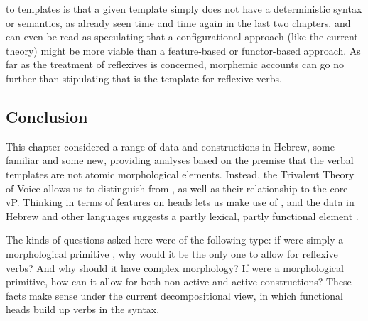 \begin{exe}
\begin{xlist}
\begin{xlist}
\begin{exe}
\begin{xlist}
\begin{xlist}
\begin{exe}
\begin{xlist}
\begin{xlist}
\begin{exe}
\begin{exe}
\begin{xlist}
\begin{exe}
\begin{exe}
\begin{xlist}
\begin{exe}
\begin{exe}
\begin{exe}
\begin{exe}
\begin{exe}
\begin{xlist}
\begin{exe}
\begin{xlist}
\begin{exe}
\begin{exe}
\begin{xlist}
\begin{exe}
\begin{xlist}
\begin{exe}
\begin{xlist}
\begin{exe}
\begin{exe}
\begin{exe}
\begin{xlist}
\begin{exe}
\begin{exe}
\begin{exe}
\begin{xlist}
\begin{exe}
\begin{xlist}
\begin{exe}
\begin{exe}
\begin{xlist}
\begin{exe}
\begin{exe}
\begin{exe}
\begin{exe}
\begin{xlist}
\begin{exe}
\begin{xlist}
\begin{exe}
\begin{xlist}
\begin{exe}
\begin{xlist}
\begin{exe}
\begin{xlist}
\begin{exe}
\begin{xlist}
\begin{exe}
\begin{exe}
\begin{xlist}
\begin{exe}
\begin{xlist}
\begin{exe}
\begin{exe}
\begin{xlist}
\begin{exe}
\begin{xlist}
\begin{exe}
\begin{exe}
\begin{exe}
\begin{exe}
\begin{xlist}
\begin{xlist}
\begin{exe}
\begin{xlist}
\begin{exe}
\begin{exe}
\begin{exe}
\begin{xlist}
\begin{exe}
\begin{exe}
\begin{xlist}
\begin{exe}
\begin{exe}
\begin{exe}
\begin{xlist}
\begin{xlist}
\begin{exe}
\begin{xlist}
\begin{exe}
\begin{exe}
\begin{exe}
\begin{exe}
\begin{xlist}
\begin{exe}
\begin{xlist}
\begin{exe}
\begin{xlist}
\begin{exe}
\begin{xlist}
\begin{exe}
\begin{exe}
\begin{exe}
\begin{exe}
\begin{exe}
\begin{xlist}
\begin{exe}
\begin{xlist}
\begin{exe}
\begin{xlist}
\begin{xlist}
\begin{exe}
\begin{xlist}
\begin{exe}
\begin{xlist}
\begin{exe}
\begin{xlist}
\begin{exe}
\begin{xlist}
to templates is that a given template simply does not have a deterministic syntax or semantics, as already seen time and time again in the last two chapters. \citet[197]{arad05} and \citet[564]{borer13oup} can even be read as speculating that a configurational approach (like the current theory) might be more viable than a feature-based or functor-based approach. As far as the treatment of reflexives is concerned, morphemic accounts can go no further than stipulating that {\thit} is the template for reflexive verbs.

	\subsection{Conclusion} \label{vz:others:conc}
This chapter considered a range of data and constructions in Hebrew, some familiar and some new, providing analyses based on the premise that the verbal templates are not atomic morphological elements. Instead, the Trivalent Theory of Voice allows us to distinguish  from {\vz}, as well as their relationship to the core vP. Thinking in terms of features on heads lets us make use of {\pz}, and the data in Hebrew and other languages suggests a partly lexical, partly functional element {\va}.

The kinds of questions asked here were of the following type: if {\thit} were simply a morphological primitive \citep{reinhartsiloni05}, why would it be the only one to allow for reflexive verbs? And why should it have complex morphology? If {\tnif} were a morphological primitive, how can it allow for both non-active and active constructions? These facts make sense under the current decompositional view, in which functional heads build up verbs in the syntax. 
\end{xlist}
\end{exe}
\end{xlist}
\end{exe}
\end{xlist}
\end{exe}
\end{xlist}
\end{exe}
\end{xlist}
\end{xlist}
\end{exe}
\end{xlist}
\end{exe}
\end{xlist}
\end{exe}
\end{exe}
\end{exe}
\end{exe}
\end{exe}
\end{xlist}
\end{exe}
\end{xlist}
\end{exe}
\end{xlist}
\end{exe}
\end{xlist}
\end{exe}
\end{exe}
\end{exe}
\end{exe}
\end{xlist}
\end{exe}
\end{xlist}
\end{xlist}
\end{exe}
\end{exe}
\end{exe}
\end{xlist}
\end{exe}
\end{exe}
\end{xlist}
\end{exe}
\end{exe}
\end{exe}
\end{xlist}
\end{exe}
\end{xlist}
\end{xlist}
\end{exe}
\end{exe}
\end{exe}
\end{exe}
\end{xlist}
\end{exe}
\end{xlist}
\end{exe}
\end{exe}
\end{xlist}
\end{exe}
\end{xlist}
\end{exe}
\end{exe}
\end{xlist}
\end{exe}
\end{xlist}
\end{exe}
\end{xlist}
\end{exe}
\end{xlist}
\end{exe}
\end{xlist}
\end{exe}
\end{xlist}
\end{exe}
\end{exe}
\end{exe}
\end{exe}
\end{xlist}
\end{exe}
\end{exe}
\end{xlist}
\end{exe}
\end{xlist}
\end{exe}
\end{exe}
\end{exe}
\end{xlist}
\end{exe}
\end{exe}
\end{exe}
\end{xlist}
\end{exe}
\end{xlist}
\end{exe}
\end{xlist}
\end{exe}
\end{exe}
\end{xlist}
\end{exe}
\end{xlist}
\end{exe}
\end{exe}
\end{exe}
\end{exe}
\end{exe}
\end{xlist}
\end{exe}
\end{exe}
\end{xlist}
\end{exe}
\end{exe}
\end{xlist}
\end{xlist}
\end{exe}
\end{xlist}
\end{xlist}
\end{exe}
\end{xlist}
\end{xlist}
\end{exe}
